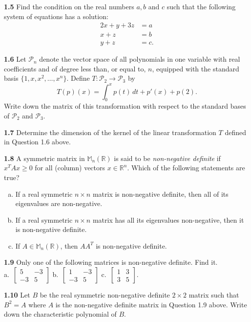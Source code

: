 \documentclass[11pt,a4paper]{article}
\newcommand{\R}{\mathbb{R}}
\newcommand{\M}{\mathbb{M}}
\newcommand{\qitem}[1]{\par\medskip\noindent\textbf{#1}\hspace{0.5em}}
\begin{document}
\qitem{1.5} Find the condition on the real numbers $a, b$ and $c$ such that the following system of equations has a solution:
\begin{align*}
  2x + y + 3z &= a \\
  x + z &= b \\
  y + z &= c.
\end{align*}

\qitem{1.6} Let $\mathcal{P}_n$ denote the vector space of all polynomials in one variable with real coefficients and of degree less than, or equal to, $n$, equipped with the standard basis $\{1, x, x^2, \dots, x^n\}$. Define $T : \mathcal{P}_2 \to \mathcal{P}_3$ by
\[
  T(p)(x) = \int_0^x p(t)\,dt + p'(x) + p(2).
\]
Write down the matrix of this transformation with respect to the standard bases of $\mathcal{P}_2$ and $\mathcal{P}_3$.

\qitem{1.7} Determine the dimension of the kernel of the linear transformation $T$ defined in Question 1.6 above.

\qitem{1.8} A symmetric matrix in $\M_n(\R)$ is said to be \emph{non-negative definite} if $x^T A x \ge 0$ for all (column) vectors $x \in \R^n$. Which of the following statements are true?
\begin{enumerate}[a.]
  \item If a real symmetric $n \times n$ matrix is non-negative definite, then all of its eigenvalues are non-negative.
  \item If a real symmetric $n \times n$ matrix has all its eigenvalues non-negative, then it is non-negative definite.
  \item If $A \in \M_n(\R)$, then $AA^T$ is non-negative definite.
\end{enumerate}

\qitem{1.9} Only one of the following matrices is non-negative definite. Find it.\\
a.\ $\begin{bmatrix} 5 & -3 \\ -3 & 5 \end{bmatrix}$ \qquad
b.\ $\begin{bmatrix} 1 & -3 \\ -3 & 5 \end{bmatrix}$ \qquad
c.\ $\begin{bmatrix} 1 & 3 \\ 3 & 5 \end{bmatrix}$.

\qitem{1.10} Let $B$ be the real symmetric non-negative definite $2 \times 2$ matrix such that $B^2 = A$ where $A$ is the non-negative definite matrix in Question 1.9 above. Write down the characteristic polynomial of $B$.
\end{document}
